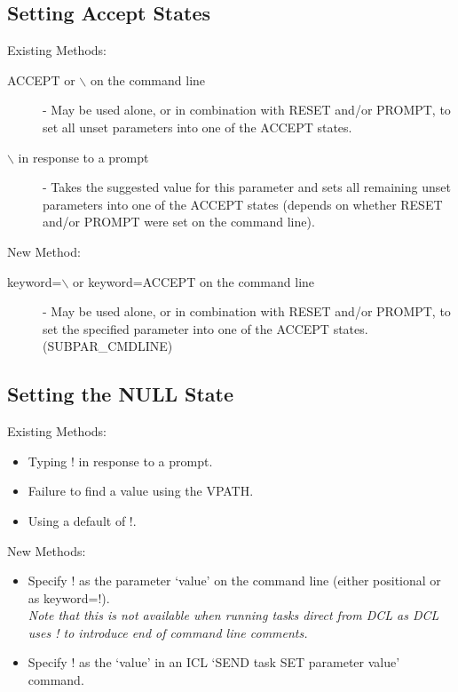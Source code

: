 \subsection{Setting Accept States}
Existing Methods:
\begin{description}
\item[ACCEPT or $\backslash$ on the command line] - May be used alone, or in
combination with RE\-SET and/or PROMPT, to set all unset parameters into one
of the ACCEPT states.
\item[$\backslash$ in response to a prompt] - Takes the suggested value for
this parameter and sets all remaining unset parameters into one of the ACCEPT
states (depends on whether RESET and/or PROMPT were set on the command line).
\end{description}
New Method:
\begin{description}
\item[keyword=$\backslash$ or keyword=ACCEPT on  the command line] - May be
used alone, or in combination with RESET and/or PROMPT, to set the specified
parameter into one of the ACCEPT states.
(SUBPAR\_CMDLINE)
\end{description}

\subsection{Setting the NULL State}
Existing Methods:
\begin{itemize}
\item Typing ! in response to a prompt.
\item Failure to find a value using the VPATH.
\item Using a default of !.
\end{itemize}
New Methods:
\begin{itemize}
\item Specify ! as the parameter `value' on the command line (either positional
or as keyword=!).\\
{\em Note that this is not available when running tasks direct from DCL as DCL
uses ! to introduce end of command line comments.}
\item Specify ! as the `value' in an ICL `SEND task SET parameter value' command.
\end{itemize}

